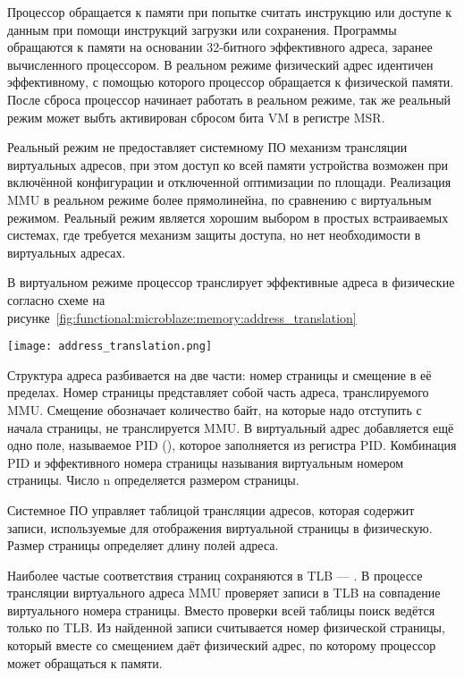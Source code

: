 Процессор обращается к памяти при попытке считать инструкцию или доступе к
данным при помощи инструкций загрузки или сохранения. Программы обращаются к
памяти на основании 32-битного эффективного адреса, заранее вычисленного процессором.
В реальном режиме физический адрес идентичен эффективному, с помощью которого
процессор обращается к физической памяти. После сброса процессор начинает работать
в реальном режиме, так же реальный режим может выбть активирован сбросом бита
VM в регистре MSR.

Реальный режим не предоставляет системному ПО механизм трансляции виртуальных адресов,
при этом доступ ко всей памяти устройства возможен при включённой конфигурации 
и отключенной оптимизации по площади. Реализация MMU в реальном режиме более прямолинейна, по
сравнению с виртуальным режимом. Реальный режим является хорошим выбором в простых встраиваемых
системах, где требуется механизм защиты доступа, но нет необходимости в виртуальных адресах.

В виртуальном режиме процессор транслирует эффективные адреса в физические согласно схеме
на рисунке~\ref{fig:functional:microblaze:memory:address_translation}

\begin{center}
  \centering
  \texttt{[image: address\_translation.png]}
  \label{fig:functional:microblaze:memory:address_translation}
\end{center}

Структура адреса разбивается на две части: номер страницы и смещение в её пределах.
Номер страницы представляет собой часть адреса, транслируемого MMU. Смещение
обозначает количество байт, на которые надо отступить с начала страницы, не
транслируется MMU. В виртуальный адрес добавляется ещё одно поле, называемое
PID (), которое заполняется из регистра PID. Комбинация
PID и эффективного номера страницы называния виртуальным номером страницы.
Число n определяется размером страницы.

Системное ПО управляет таблицой трансляции адресов, которая содержит
записи, используемые для отображения виртуальной страницы в физическую. Размер страницы
определяет длину полей адреса.

Наиболее частые соответствия страниц сохраняются в TLB --- .
В процессе трансляции виртуального адреса MMU проверяет записи в TLB на совпадение
виртуального номера страницы. Вместо проверки всей таблицы поиск ведётся только по TLB.
Из найденной записи считывается номер физической страницы, который вместе со смещением
даёт физический адрес, по которому процессор может обращаться к памяти.


